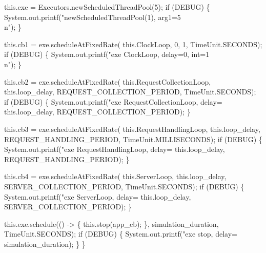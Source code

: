   this.exe = Executors.newScheduledThreadPool(5);
  if (DEBUG) \{
    System.out.printf("newScheduledThreadPool(1), arg1=5\\n");
  \}

  this.cb1 = exe.scheduleAtFixedRate(
    this.ClockLoop, 0, 1, TimeUnit.SECONDS);
  if (DEBUG) \{
    System.out.printf("exe ClockLoop, delay=0, int=1\\n");
  \}

  this.cb2 = exe.scheduleAtFixedRate(
    this.RequestCollectionLoop, this.loop_delay, REQUEST_COLLECTION_PERIOD, TimeUnit.SECONDS);
  if (DEBUG) \{
    System.out.printf("exe RequestCollectionLoop, delay=%
        this.loop_delay, REQUEST_COLLECTION_PERIOD);
  \}

  this.cb3 = exe.scheduleAtFixedRate(
    this.RequestHandlingLoop, this.loop_delay, REQUEST_HANDLING_PERIOD, TimeUnit.MILLISECONDS);
  if (DEBUG) \{
    System.out.printf("exe RequestHandlingLoop, delay=%
        this.loop_delay, REQUEST_HANDLING_PERIOD);
  \}

  this.cb4 = exe.scheduleAtFixedRate(
    this.ServerLoop, this.loop_delay, SERVER_COLLECTION_PERIOD, TimeUnit.SECONDS);
  if (DEBUG) \{
    System.out.printf("exe ServerLoop, delay=%
        this.loop_delay, SERVER_COLLECTION_PERIOD);
  \}

  this.exe.schedule(() -> \{
    this.stop(app_cb);
  \}, simulation_duration, TimeUnit.SECONDS);
  if (DEBUG) \{
    System.out.printf("exe stop, delay=%
        simulation_duration);
  \}
\}
\eatline
{}\nwendcode{}\nwdocspar
